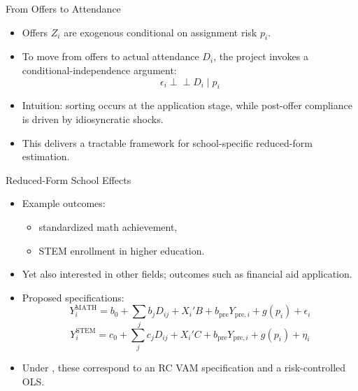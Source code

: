 \documentclass[notes,11pt, aspectratio=169]{beamer}
\let\oldparencite\parencite
\renewcommand{\parencite}[2][]{%
  \footnotesize {\tiny \oldparencite[#1]{#2}} \normalsize %
}
\begin{document}
\begin{frame}{From Offers to Attendance}
\begin{itemize}
    \item Offers \(Z_i\) are exogenous conditional on assignment risk \(p_i\).
    \item To move from offers to actual attendance \(D_i\), the project invokes a conditional-independence argument:
    \[
    \epsilon_i \perp\!\!\!\perp D_i \mid p_i
    \]
    \item Intuition: sorting occurs at the application stage, while post-offer compliance is driven by idiosyncratic shocks. \parencite{dale_estimating_2002} 
    \item This delivers a tractable framework for school-specific reduced-form estimation. \parencite[]{angrist_methods_2023-1}
\end{itemize}

\end{frame}

\begin{frame}{Reduced-Form School Effects}
\begin{itemize}
    \item Example outcomes:
    \begin{itemize}
        \item standardized math achievement,
        \item STEM enrollment in higher education.
    \end{itemize}
    \item Yet also interested in other fields; outcomes such as financial aid application.
    \item Proposed specifications:
    \[
    Y_i^{\text{MATH}} = b_0 + \sum_j b_j D_{ij} + X_i'B + b_{\text{pre}}Y_{\text{pre},i} + g(p_i) + \epsilon_i
    \]
    \[
    Y_i^{\text{STEM}} = c_0 + \sum_j c_j D_{ij} + X_i'C + b_{\text{pre}}Y_{\text{pre},i} + g(p_i) + \eta_i
    \]
    \item Under \textcite{angrist_credible_2024}, these correspond to an RC VAM specification and a risk-controlled OLS.
\end{itemize}
\end{frame}
\end{document}
